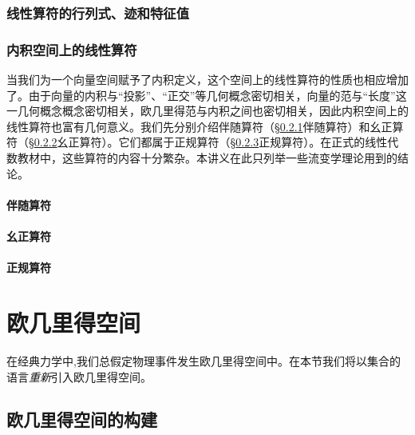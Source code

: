\documentclass[zihao=-4,linespread=1.5,a4paper,heading=true,twoside]{ctexbook}
\theoremstyle{definition}
\theoremstyle{plain}
\begin{document}
\subsection{线性算符的行列式、迹和特征值}\label{sec:II.2.4.1}


\subsection{内积空间上的线性算符}\label{sec:II.2.4.2}
当我们为一个向量空间赋予了内积定义，这个空间上的线性算符的性质也相应增加了。由于向量的内积与“投影”、“正交”等几何概念密切相关，向量的范与“长度”这一几何概念概念密切相关，欧几里得范与内积之间也密切相关，因此内积空间上的线性算符也富有几何意义。我们先分别介绍伴随算符（\S \ref{sec:II.2.4.2_adjoint}伴随算符）和幺正算符（\S \ref{sec:II.2.4.2_unitary}幺正算符）。它们都属于正规算符（\S \ref{sec:II.2.4.2_normal}正规算符）。在正式的线性代数教材中，这些算符的内容十分繁杂。本讲义在此只列举一些流变学理论用到的结论。

\subsubsection{伴随算符}\label{sec:II.2.4.2_adjoint}

\subsubsection{幺正算符}\label{sec:II.2.4.2_unitary}

\subsubsection{正规算符}\label{sec:II.2.4.2_normal}




\chapter{欧几里得空间}\label{sec:II.3}
在经典力学中,我们总假定物理事件发生欧几里得空间中。在本节我们将以集合的语言\emph{重新}引入欧几里得空间。
\section{欧几里得空间的构建}\label{sec:II.3.1}

\end{document}
